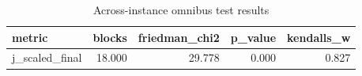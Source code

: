 \begin{table}[!t]
\centering
\caption{Across-instance omnibus test results}
\label{tab:friedman_omnibus_generated}
\begin{tabular}{lrrrr}
\toprule
metric & blocks & friedman_chi2 & p_value & kendalls_w \\
\midrule
j_scaled_final & 18.000 & 29.778 & 0.000 & 0.827 \\
\bottomrule
\end{tabular}

\end{table}